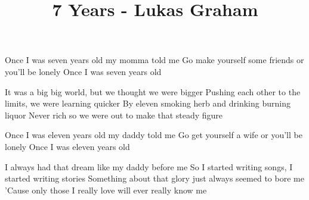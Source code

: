 \documentclass{article}
\begin{document}
\title{ 7 Years - Lukas Graham }
Once I was seven years old my momma told me
Go make yourself some friends or you'll be lonely
Once I was seven years old

It was a big big world, but we thought we were bigger
Pushing each other to the limits, we were learning quicker
By eleven smoking herb and drinking burning liquor
Never rich so we were out to make that steady figure

Once I was eleven years old my daddy told me
Go get yourself a wife or you'll be lonely
Once I was eleven years old

I always had that dream like my daddy before me
So I started writing songs, I started writing stories
Something about that glory just always seemed to bore me
'Cause only those I really love will ever really know me
\end{document}
